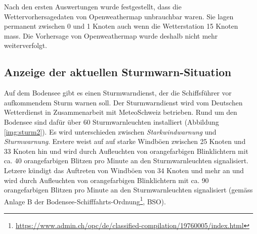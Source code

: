 Nach den ersten Auswertungen wurde festgestellt, dass die Wettervorhersagedaten von Openweathermap unbrauchbar waren. Sie lagen permanent zwischen 0 und 1 Knoten auch wenn die Wetterstation 15 Knoten mass. Die Vorhersage von Openweathermap wurde deshalb nicht mehr weiterverfolgt.





\subsection{Anzeige der aktuellen Sturmwarn-Situation}
\label{subsec:sturmwarnung}

Auf dem Bodensee gibt es einen Sturmwarndienst, der die Schiffsführer vor aufkommendem Sturm warnen soll. Der Sturmwarndienst wird vom Deutschen Wetterdienst in Zusammenarbeit mit MeteoSchweiz betrieben. Rund um den Bodensee sind dafür über 60 Sturmwarnleuchten installiert (Abbildung \ref{img:sturm2}). Es wird unterschieden zwischen \textit{Starkwindwarnung} und \textit{Sturmwarnung}. Erstere weist auf auf starke Windböen zwischen 25 Knoten und 33 Knoten hin und wird durch Aufleuchten von orangefarbigen Blinklichtern mit ca. 40 orangefarbigen Blitzen pro Minute an den Sturmwarnleuchten signalisiert. Letzere kündigt das Auftreten von Windböen von 34 Knoten und mehr an und wird durch Aufleuchten von orangefarbigen Blinklichtern mit ca. 90 orangefarbigen Blitzen pro Minute an den Sturmwarnleuchten signalisiert (gemäss Anlage B der Bodensee-Schifffahrts-Ordnung\footnote{ \url{https://www.admin.ch/opc/de/classified-compilation/19760005/index.html}}, BSO).

